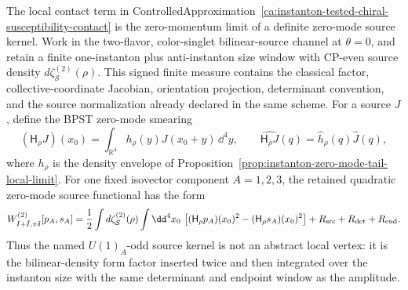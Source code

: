 \begin{controlledapproximation}
\label{ca:finite-momentum-pion-delta-instanton-source-kernel}
The local contact term in
ControlledApproximation~\ref{ca:instanton-tested-chiral-susceptibility-contact}
is the zero-momentum limit of a definite zero-mode source kernel.  Work in
the two-flavor, color-singlet bilinear-source channel at \(\theta=0\), and
retain a finite one-instanton plus anti-instanton size window with CP-even
source density \(d\zeta_{\mathcal S}^{(2)}(\rho)\).  This signed finite
measure contains the classical factor, collective-coordinate Jacobian,
orientation projection, determinant convention, and the source normalization
already declared in the same scheme.  For a source \(J\), define the BPST
zero-mode smearing
\begin{equation}
  (\mathsf H_\rho J)(x_0)
  =
  \int_{\mathbb R^4}h_\rho(y)J(x_0+y)\,\dd^4y,
  \qquad
  \widehat{\mathsf H_\rho J}(q)
  =
  \widehat h_\rho(q)\widehat J(q),
  \label{eq:instanton-smeared-chiral-source}
\end{equation}
where \(h_\rho\) is the density envelope of
Proposition~\ref{prop:instanton-zero-mode-tail-local-limit}.  For one fixed
isovector component \(A=1,2,3\), the retained quadratic zero-mode source
functional has the form
\begin{equation}
  W_{I+\bar I,\pi\delta}^{(2)}[p_A,s_A]
  =
  \frac12
  \int d\zeta_{\mathcal S}^{(2)}(\rho)
  \int\dd^4x_0\,
  \left[
    (\mathsf H_\rho p_A)(x_0)^2
    -
    (\mathsf H_\rho s_A)(x_0)^2
  \right]
  +R_{\rm src}+R_{\rm det}+R_{\rm end}.
  \label{eq:finite-momentum-pion-delta-source-functional}
\end{equation}
Thus the named \(U(1)_A\)-odd source kernel is not an abstract local vertex:
it is the bilinear-density form factor inserted twice and then integrated
over the instanton size with the same determinant and endpoint window as the
amplitude.


\end{controlledapproximation}
